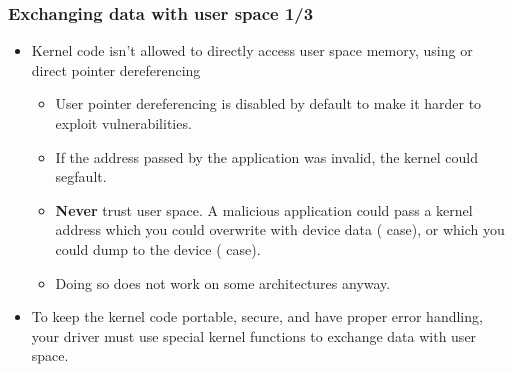 \begin{frame}
  \frametitle{Exchanging data with user space 1/3}
  \begin{itemize}
  \item Kernel code isn't allowed to directly access user space
    memory, using  or direct pointer dereferencing
    \begin{itemize}
    \item User pointer dereferencing is disabled by default to make it
      harder to exploit vulnerabilities.
    \item If the address passed by the application was invalid, the
      kernel could segfault.
    \item {\bf Never} trust user space. A malicious application could
      pass a kernel address which you could overwrite with device data
      ( case), or which you could dump to the device
      ( case).
    \item Doing so does not work on some architectures anyway.
    \end{itemize}
  \item To keep the kernel code portable, secure, and have proper
    error handling, your driver must use special kernel functions
    to exchange data with user space.
  \end{itemize}
\end{frame}

